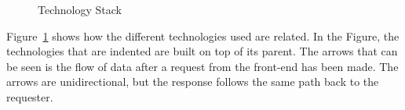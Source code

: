 \documentclass[a4paper,12pt]{article}
\begin{document}
\begin{figure}[H] 
    \caption{Technology Stack}
    \label{fig:tech_stack}
\end{figure}
Figure~\ref{fig:tech_stack} shows how the different technologies used are related. In the Figure, 
the technologies that are indented are built on top of its parent. The arrows that can be seen is
the flow of data after a request from the front-end has been made. The arrows are unidirectional,
but the response follows the same path back to the requester.
\end{document}
